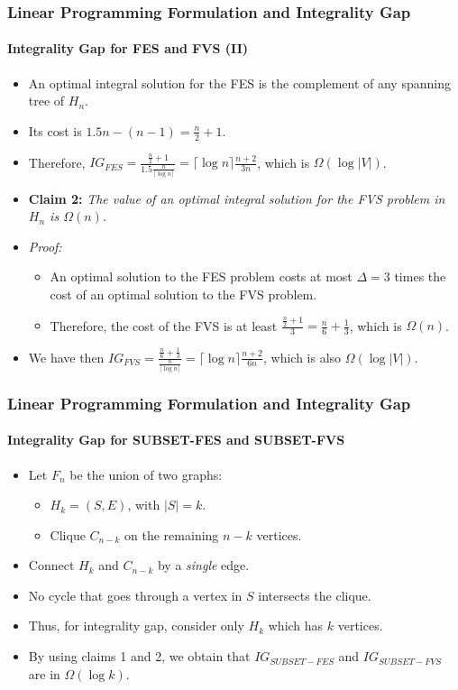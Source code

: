 \documentclass[10pt]{beamer}
\begin{document}
\begin{frame}
    \frametitle{Linear Programming Formulation and Integrality Gap}
    \framesubtitle{Integrality Gap for FES and FVS (II)}
    \begin{itemize}
        \item An optimal integral solution for the FES is the complement of any spanning tree of \(H_n\).
        \item Its cost is \(1.5n - (n - 1) = \frac{n}{2} + 1\).
        \item Therefore, \(IG_{FES} = \frac{\frac{n}{2} + 1}{1.5\frac{n}{\lceil \log n \rceil}} = \lceil \log n \rceil \frac{n+2}{3n}\), which is \(\Omega(\log |V|)\).
        \item \textbf{Claim 2:} \textit{The value of an optimal integral solution for the FVS problem in \(H_n\) is \(\Omega(n)\).}
        \item \textit{Proof:} 
        \begin{itemize}
            \item An optimal solution to the FES problem costs at most \(\Delta = 3\) times the cost of an optimal solution to the FVS problem.
            \item Therefore, the cost of the FVS is at least \(\frac{\frac{n}{2} + 1}{3} = \frac{n}{6} + \frac{1}{3}\), which is \(\Omega(n)\).
        \end{itemize}
        \item We have then \(IG_{FVS} = \frac{\frac{n}{6} + \frac{1}{3}}{\frac{n}{\lceil \log n \rceil}} = \lceil \log n \rceil \frac{n+2}{6n}\), which is also \(\Omega(\log |V|)\).
    \end{itemize}
\end{frame}

\begin{frame}
    \frametitle{Linear Programming Formulation and Integrality Gap}
    \framesubtitle{Integrality Gap for SUBSET-FES and SUBSET-FVS}
    \begin{itemize}
        \item Let \(F_n\) be the union of two graphs:
        \begin{itemize}
            \item \(H_k = (S,E)\), with \(|S| = k\).
            \item Clique \(C_{n-k}\) on the remaining \(n-k\) vertices.
        \end{itemize}
        \item Connect \(H_k\) and \(C_{n-k}\) by a \textit{single} edge.
        \item No cycle that goes through a vertex in \(S\) intersects the clique.
        \item Thus, for integrality gap, consider only \(H_k\) which has \(k\) vertices.
        \item By using claims 1 and 2, we obtain that \(IG_{SUBSET-FES}\) and \(IG_{SUBSET-FVS}\) are in \(\Omega(\log k)\).
    \end{itemize}
\end{frame}
\end{document}
